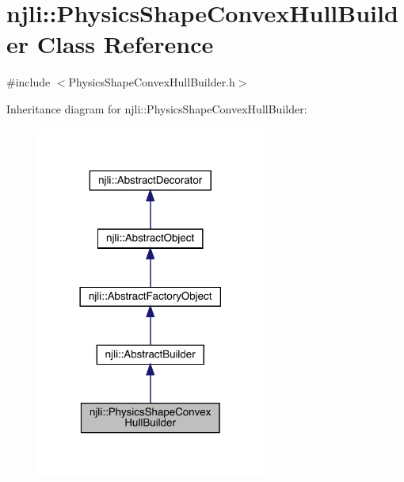 \hypertarget{classnjli_1_1_physics_shape_convex_hull_builder}{}\section{njli\+:\+:Physics\+Shape\+Convex\+Hull\+Builder Class Reference}
\label{classnjli_1_1_physics_shape_convex_hull_builder}


{\ttfamily \#include $<$Physics\+Shape\+Convex\+Hull\+Builder.\+h$>$}



Inheritance diagram for njli\+:\+:Physics\+Shape\+Convex\+Hull\+Builder\+:\nopagebreak
\begin{figure}[H]
\begin{center}
\leavevmode
\includegraphics[width=213pt]{classnjli_1_1_physics_shape_convex_hull_builder__inherit__graph}
\end{center}
\end{figure}


